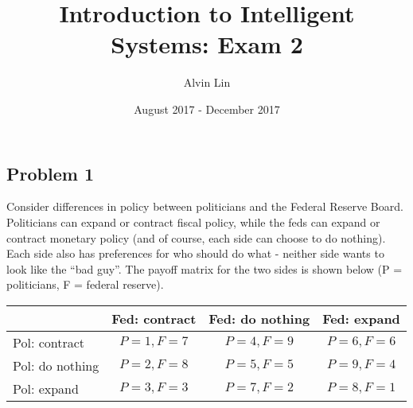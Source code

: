 \documentclass{math}
\title{Introduction to Intelligent Systems: Exam 2}
\author{Alvin Lin}
\date{August 2017 - December 2017}
\begin{document}
\maketitle

\subsection*{Problem 1}
Consider differences in policy between politicians and the Federal Reserve
Board. Politicians can expand or contract fiscal policy, while the feds can
expand or contract monetary policy (and of course, each side can choose to do
nothing). Each side also has preferences for who should do what - neither side
wants to look like the ``bad guy''. The payoff matrix for the two sides is shown
below (P = politicians, F = federal reserve).
\begin{center}
  \begin{tabular}[h!]{|l||c|c|c|}
    \hline
    & Fed: contract  & Fed: do nothing & Fed: expand \\ \hline \hline
    Pol: contract & \( P=1, F=7 \) & \( P=4, F=9 \) & \( P=6, F=6 \) \\ \hline
    Pol: do nothing & \( P=2, F=8 \) & \( P=5, F=5 \) & \( P=9, F=4 \) \\ \hline
    Pol: expand & \( P=3, F=3 \) & \( P=7, F=2 \) & \( P=8, F=1 \) \\ \hline
  \end{tabular}
\end{center}
\end{document}
